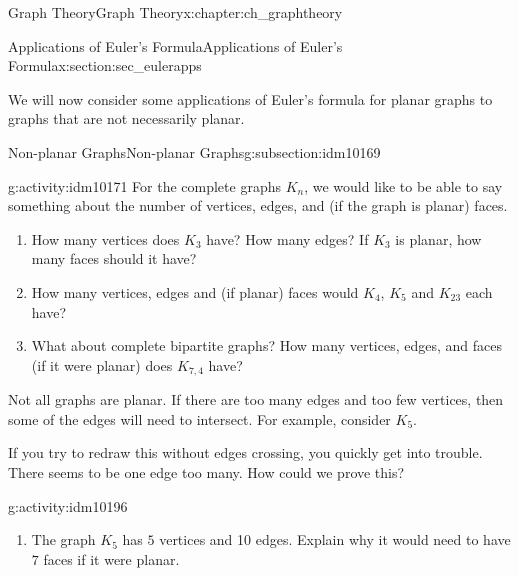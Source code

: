 \documentclass[oneside,10pt,]{book}
\numberwithin{equation}{chapter}
\newcommand{\vtx}[2]{node[fill,circle,inner sep=0pt, minimum size=4pt,label=#1:#2]{}}
\renewcommand{\v}{\vtx{above}{}}
\begin{document}
\begin{chapterptx}{Graph Theory}{}{Graph Theory}{}{}{x:chapter:ch_graphtheory}
\begin{sectionptx}{Applications of Euler's Formula}{}{Applications of Euler's Formula}{}{}{x:section:sec_eulerapps}
\begin{introduction}{}%
We will now consider some applications of Euler's formula for planar graphs to graphs that are not necessarily planar.%
\end{introduction}%
%
%
\typeout{************************************************}
\typeout{************************************************}
%
\begin{subsectionptx}{Non-planar Graphs}{}{Non-planar Graphs}{}{}{g:subsection:idm10169}
\begin{activity}{}{g:activity:idm10171}%
For the complete graphs \(K_n\), we would like to be able to say something about the number of vertices, edges, and (if the graph is planar) faces.%
\begin{enumerate}[font=\bfseries,label=(\alph*),ref=\alph*]
\item{}How many vertices does \(K_3\) have? How many edges?  If \(K_3\) is planar, how many faces should it have?%
\item{}How many vertices, edges and (if planar) faces would \(K_4\), \(K_5\) and \(K_{23}\) each have?%
\item{}What about complete bipartite graphs? How many vertices, edges, and faces (if it were planar) does \(K_{7,4}\) have?%
\end{enumerate}
\end{activity}
Not all graphs are planar. If there are too many edges and too few vertices, then some of the edges will need to intersect. For example, consider \(K_5\).%
\begin{sidebyside}{1}{0.4}{0.4}{0}%
\begin{sbspanel}{0.2}%
\resizebox{\linewidth}{!}{%
\begin{tikzpicture}
          \foreach \x in {0,...,4}
          \draw (\x*72+18:1) \v -- (\x*72+90:1) -- (\x*72-54:1);
        \end{tikzpicture}
}%
\end{sbspanel}%
\end{sidebyside}%
\par
If you try to redraw this without edges crossing, you quickly get into trouble. There seems to be one edge too many. How could we prove this?%
\begin{activity}{}{g:activity:idm10196}%
\begin{enumerate}[font=\bfseries,label=(\alph*),ref=\alph*]
\item{}The graph \(K_5\) has \(5\) vertices and 10 edges.  Explain why it would need to have \(7\) faces if it were planar.%

\end{enumerate}
\end{activity}
\end{subsectionptx}
\end{sectionptx}
\end{chapterptx}
\end{document}
